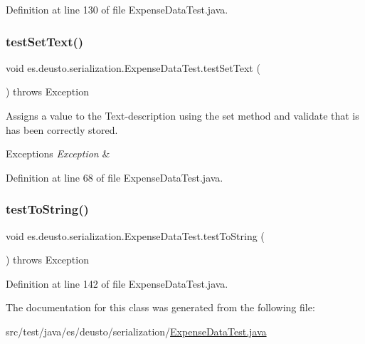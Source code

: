 Definition at line 130 of file Expense\+Data\+Test.\+java.

\mbox{\label{classes_1_1deusto_1_1serialization_1_1_expense_data_test_a9b9120ede1751dc400bbe740d6bfa87e}} 
\subsubsection{\texorpdfstring{test\+Set\+Text()}{testSetText()}}
{\footnotesize\ttfamily void es.\+deusto.\+serialization.\+Expense\+Data\+Test.\+test\+Set\+Text (\begin{DoxyParamCaption}{ }\end{DoxyParamCaption}) throws Exception}

Assigns a value to the Text-\/description using the set method and validate that is has been correctly stored.~\newline
 
\begin{DoxyExceptions}{Exceptions}
{\em Exception} & \\
\hline
\end{DoxyExceptions}


Definition at line 68 of file Expense\+Data\+Test.\+java.

\mbox{\label{classes_1_1deusto_1_1serialization_1_1_expense_data_test_a36e81a35700d9baa7ff9ff65552e32c6}} 
\subsubsection{\texorpdfstring{test\+To\+String()}{testToString()}}
{\footnotesize\ttfamily void es.\+deusto.\+serialization.\+Expense\+Data\+Test.\+test\+To\+String (\begin{DoxyParamCaption}{ }\end{DoxyParamCaption}) throws Exception}



Definition at line 142 of file Expense\+Data\+Test.\+java.



The documentation for this class was generated from the following file\+:\begin{DoxyCompactItemize}
\item 
src/test/java/es/deusto/serialization/\hyperlink{_expense_data_test_8java}{Expense\+Data\+Test.\+java}\end{DoxyCompactItemize}
